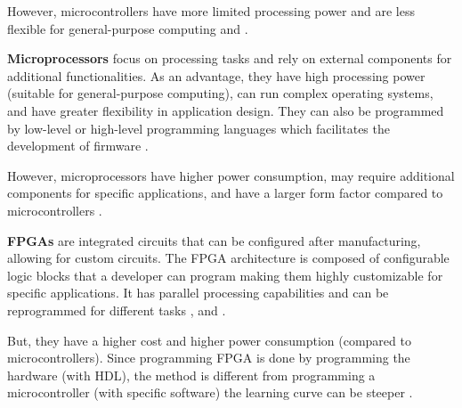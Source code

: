However, microcontrollers have more limited processing power and are less flexible for general-purpose computing \cite{OBC1} and \cite{OBC2}.

\textbf{Microprocessors} focus on processing tasks and rely on external components for additional functionalities.
As an advantage, they have high processing power (suitable for general-purpose computing), can run complex operating systems, and have greater flexibility in application design.
They can also be programmed by low-level or high-level programming languages which facilitates the development of firmware \cite{OBC5}.

However, microprocessors have higher power consumption, may require additional components for specific applications, and have a larger form factor compared to microcontrollers \cite{OBC5}.

\textbf{\glspl{FPGA}} are integrated circuits that can be configured after manufacturing, allowing for custom circuits.
The \gls{FPGA} architecture is composed of configurable logic blocks that a developer can program making them highly customizable for specific applications.
It has parallel processing capabilities and can be reprogrammed for different tasks \cite{OBC1}, \cite{OBC3} and \cite{OBC5}.

But, they have a higher cost and higher power consumption (compared to microcontrollers).
Since programming \gls{FPGA} is done by programming the hardware (with \gls{HDL}), the method is different from programming a microcontroller (with specific software) the learning curve can be steeper \cite{OBC1} \cite{OBC3}.

